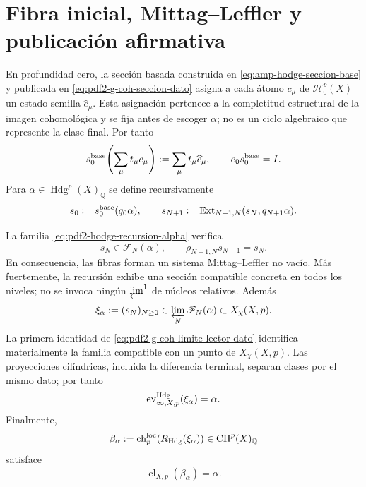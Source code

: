 \section{Fibra inicial, Mittag--Leffler y publicación afirmativa}

En profundidad cero, la sección basada construida en
\eqref{eq:amp-hodge-seccion-base} y publicada en
\eqref{eq:pdf2-g-coh-seccion-dato} asigna a cada átomo $c_\mu$ de
$\mathscr H_0^p(X)$ un estado semilla $\widehat c_\mu$. Esta asignación
pertenece a la completitud estructural de la imagen cohomológica y se fija
antes de escoger $\alpha$; no es un ciclo algebraico que represente la
clase final. Por tanto
\begin{equation}\label{eq:pdf2-hodge-seccion-base}
 s_0^{\rm base}\!\left(\sum_\mu t_\mu c_\mu\right)
 :=\sum_\mu t_\mu\widehat c_\mu,
 \qquad e_0s_0^{\rm base}=I.
\end{equation}
Para $\alpha\in\operatorname{Hdg}^p(X)_{\mathbb Q}$ se define
recursivamente
\begin{equation}\label{eq:pdf2-hodge-recursion-alpha}
 s_0:=s_0^{\rm base}(q_0\alpha),
 \qquad
 s_{N+1}:=\operatorname{Ext}_{N+1,N}(s_N,q_{N+1}\alpha).
\end{equation}

\begin{theorem}
\label{thm:pdf2-hodge-completitud-final}
La familia \eqref{eq:pdf2-hodge-recursion-alpha} verifica
\[
 s_N\in\mathscr F_N(\alpha),
 \qquad \rho_{N+1,N}s_{N+1}=s_N.
\]
En consecuencia, las fibras forman un sistema Mittag--Leffler no vacío. Más
fuertemente, la recursión exhibe una sección compatible concreta en todos los
niveles; no se invoca ningún \(\varprojlim^1\) de núcleos relativos. Además
\begin{equation}\label{eq:pdf2-hodge-xi-alpha}
 \xi_\alpha:=(s_N)_{N\ge0}
 \in\varprojlim_N\mathscr F_N(\alpha)\subset X_\chi(X,p).
\end{equation}
La primera identidad de \eqref{eq:pdf2-g-coh-limite-lector-dato} identifica
materialmente la familia compatible con un punto de $X_\chi(X,p)$. Las
proyecciones cilíndricas, incluida la diferencia terminal, separan clases por
el mismo dato; por tanto
\begin{equation}\label{eq:pdf2-hodge-evaluacion-alpha}
 \operatorname{ev}^{\rm Hdg}_{\infty,X,p}(\xi_\alpha)=\alpha.
\end{equation}
Finalmente,
\begin{equation}\label{eq:pdf2-hodge-beta}
 \beta_\alpha:=\operatorname{ch}^{\rm loc}_p
 (R_{\rm Hdg}(\xi_\alpha))\in\operatorname{CH}^p(X)_{\mathbb Q}
\end{equation}
satisface
\begin{equation}\label{eq:pdf2-hodge-clase-final}
 \operatorname{cl}_{X,p}(\beta_\alpha)=\alpha.
\end{equation}
\end{theorem}

